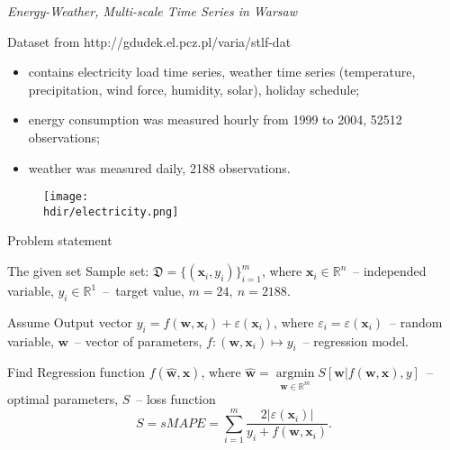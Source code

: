 \documentclass[xcolor=table]{beamer}
\newcommand{\hdir}{.}
\newcommand{\bx}{\mathbf{x}}
\newcommand{\bw}{\mathbf{w}}
\begin{document}
\begin{frame}{\textit{Energy-Weather, Multi-scale Time Series in Warsaw}}


	\vspace{-0.1cm}
	Dataset from {\footnotesize http://gdudek.el.pcz.pl/varia/stlf-dat}



	\begin{itemize}
		\item contains electricity load time series, weather time series (temperature, precipitation, wind force, humidity, solar), holiday schedule;
		\item energy consumption was measured hourly from 1999 to 2004, 52512 observations;
		\item weather was measured daily, 2188 observations.
		
	\end{itemize}

	\vspace{-0.3cm}
	\begin{figure}
		\texttt{[image: \\hdir/electricity.png]}
	\end{figure}
	\vspace{-0.5cm}
\end{frame}
\begin{frame}{Problem statement}

	\begin{block}{The given set}
	 	Sample set: $\mathfrak{D} = \{(\bx_i, y_i)\}_{i = 1}^m$, where $\bx_i \in \mathbb{R}^{n}$~-- independed variable, $y_i\in \mathbb{R}^{1}$~--~target value, $m = 24,\ n = 2188$.
	\end{block}

	\begin{block}{Assume}
		Output	vector $y_i = f(\bw, \bx_i) + \varepsilon(\bx_i)$, where $\varepsilon_i = \varepsilon(\bx_i)$~-- random variable, $\bw$~-- vector of parameters, $f: (\bw, \bx_i) \mapsto y_i$~-- regression model.
	\end{block}

	\begin{block}{Find}
    	Regression function $f(\hat{\bw}, \bx)$, where $\hat{\bw} = \mathop{\text{argmin}} \limits_{\bw \in \mathbb{R}^{m}} S[\bw | f(\bw, \bx), y]$~-- optimal parameters, $S$~-- loss function  
    	\[
    		S = sMAPE = \sum_{i=1}^m \frac{2 |\varepsilon(\bx_i)|}{y_i + f(\bw, \bx_i)}.
    	\]
  	\end{block}
\end{frame}
\end{document}
